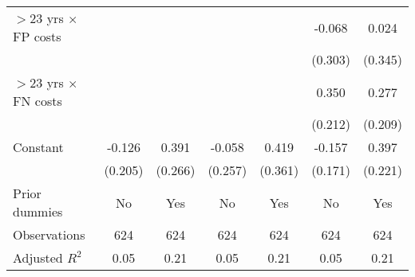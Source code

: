 \begin{tabular}{l*{6}{c}}
$>$23 yrs $\times$ FP costs&         &         &         &         &   -0.068&    0.024\\
                &         &         &         &         &  (0.303)&  (0.345)\\
$>$23 yrs $\times$ FN costs&         &         &         &         &    0.350&    0.277\\
                &         &         &         &         &  (0.212)&  (0.209)\\
Constant        &   -0.126&    0.391&   -0.058&    0.419&   -0.157&    0.397\\
                &  (0.205)&  (0.266)&  (0.257)&  (0.361)&  (0.171)&  (0.221)\\
Prior dummies   &       No&      Yes&       No&      Yes&       No&      Yes\\
\hline
Observations    &      624&      624&      624&      624&      624&      624\\
Adjusted \(R^{2}\)&     0.05&     0.21&     0.05&     0.21&     0.05&     0.21\\
\hline\hline
\end{tabular}

